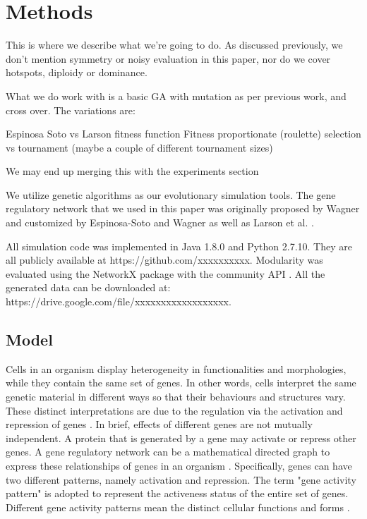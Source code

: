 \section{Methods}
This is where we describe what we're going to do. As discussed previously, 
we don't mention symmetry or noisy evaluation in this paper, nor do we cover 
hotspots, diploidy or dominance.

What we do work with is a basic GA with mutation as per previous work, and cross
over. The variations are:

Espinosa Soto vs Larson fitness function
Fitness proportionate (roulette) selection vs tournament (maybe a couple of different tournament sizes)

We may end up merging this with the experiments section

We utilize genetic algorithms as our evolutionary simulation tools. The gene regulatory network that we used in this paper was originally proposed by Wagner \cite{wagner1996does} and customized by Espinosa-Soto and Wagner \cite{espinosa2010specialization} as well as Larson et al. \cite{larson2016recombination}. 

All simulation code was implemented in Java 1.8.0 and Python 2.7.10. They are all publicly available at https://github.com/xxxxxxxxxx. Modularity was evaluated using the NetworkX package with the community API \cite{hagberg2008exploring}. All the generated data can be downloaded at: https://drive.google.com/file/xxxxxxxxxxxxxxxxxx. 

\subsection{Model}
Cells in an organism display heterogeneity in functionalities and morphologies, while they contain the same set of genes. In other words, cells interpret the same genetic material in different ways so that their behaviours and structures vary. These distinct interpretations are due to the regulation via the activation and repression of genes \cite{wagner1996does}. In brief, effects of different genes are not mutually independent. A protein that is generated by a gene may activate or repress other genes. A gene regulatory network can be a mathematical directed graph to express these relationships of genes in an organism \cite{wagner1996does}. Specifically, genes can have two different patterns, namely activation and repression. The term "gene activity pattern" is adopted to represent the activeness status of the entire set of genes. Different gene activity patterns mean the distinct cellular functions and forms \cite{espinosa2010specialization}. 

